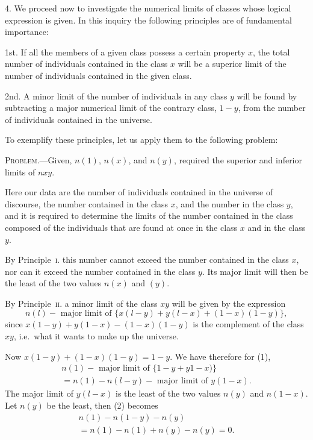 \documentclass[oneside]{book}
\begin{document}
4. We proceed now to investigate the numerical limits of
classes whose logical expression is given. In this inquiry the
following principles are of fundamental importance:

1st. If all the members of a given class possess a certain property
$x$, the total number of individuals contained in the class $x$
will be a superior limit of the number of individuals contained in
the given class.

2nd. A minor limit of the number of individuals in any class $y$
will be found by subtracting a major numerical limit of the contrary class, $1-y$, from the number of individuals contained in the
universe.

To exemplify these principles, let us apply them to the following problem:

\textsc{Problem}.---Given, $n(1)$, $n(x)$, and $n(y)$, required the superior and inferior limits of $nxy$.

Here our data are the number of individuals contained in the universe of discourse, the number contained in the class $x$, and the number in the class $y$, and it is required to determine the limits of the number contained in the class composed of the individuals that are found at once in the class $x$ and in the class $y$.

By Principle~\textsc{i.} this number cannot exceed the number contained in the class $x$, nor can it exceed the number contained in the class $y$. Its major limit will then be the least of the two values $n(x)$ and $(y)$.

By Principle~\textsc{ii.} a minor limit of the class $xy$ will be given by
the expression
\[
  n(l) - \text{ major limit of }\{x(l-y) + y(l-x) + (1-x)(1-y)\}, \tag{1}
\]
since $x(1-y) + y(1-x) - (1-x)(1-y)$ is the complement of
the class $xy$, i.e.\ what it wants to make up the universe.

Now $x(1-y) + (1-x)(1-y) = 1-y$. We have therefore for (1),
\[
\begin{split}
  n(1) - \text{ major limit of }\{1-y + y 1-x)\}   \\
= n(1) - n(l-y) - \text{ major limit of }y(1-x).  %
\end{split}
\]
The major limit of $y(l-x)$ is the least of the two values $n(y)$ and $n(1-x)$. Let $n(y)$ be the least, then (2) becomes
\[
\begin{split}
  n(1) - n(1-y) - n(y)  \\
= n(1) - n(1) + n(y) -n(y) = 0.
\end{split}
\]
\end{document}
